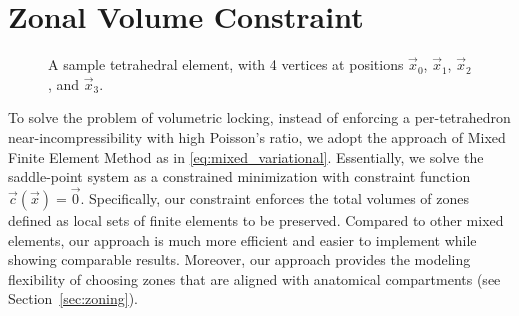 \chapter{Zonal Volume Constraint}
\label{ch:Zonal Volume Constraint}

\begin{figure}[t]
	\centering
	\caption{A sample tetrahedral element, with 4 vertices at positions $\vec{x}_0$, $\vec{x}_1$, $\vec{x}_2$, and
		$\vec{x}_3$.}
	\label{fig:f2}
\end{figure}

To solve the problem of volumetric locking, instead of enforcing a per-tetrahedron
near-incompressibility with high Poisson's ratio, 
we adopt the approach of Mixed Finite Element Method as in \ref{eq:mixed_variational}. Essentially,
we solve the saddle-point system as a constrained minimization with constraint function
$\vec{c}(\vec{x}) = \vec{0}$. Specifically, our constraint enforces the total volumes of zones defined as
local sets of finite elements to be preserved.
Compared to other mixed elements, our approach is much more efficient and easier to implement while showing
comparable results. Moreover, our approach provides the modeling flexibility of choosing zones that 
are aligned with anatomical compartments (see Section~\ref{sec:zoning}).

